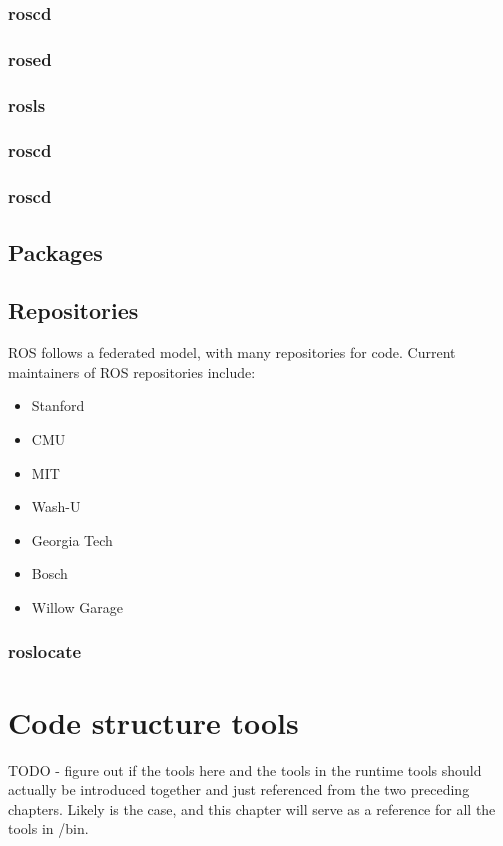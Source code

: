 \subsubsection{roscd}
\subsubsection{rosed}
\subsubsection{rosls}
\subsubsection{roscd}
\subsubsection{roscd}
\subsection{Packages}
\subsection{Repositories}
ROS follows a federated model, with many repositories for code.  Current maintainers of ROS repositories include:
\begin{itemize}
\item Stanford
\item CMU
\item MIT
\item Wash-U
\item Georgia Tech
\item Bosch
\item Willow Garage
\end{itemize}
\subsubsection{roslocate}
\section{Code structure tools}
TODO - figure out if the tools here and the tools in the runtime tools should actually be introduced together and just referenced from the two preceding chapters.  Likely is the case, and this chapter will serve as a reference for all the tools in /bin.
